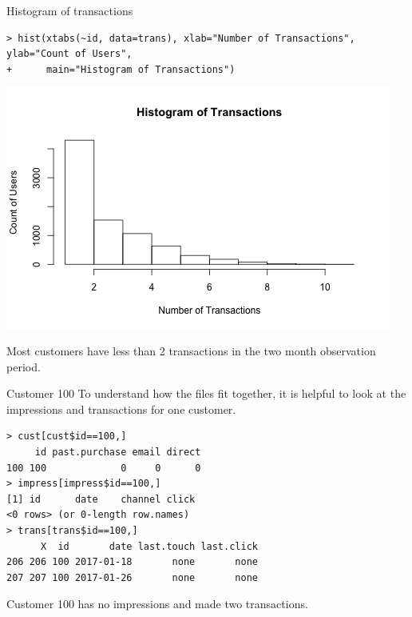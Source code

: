 \documentclass[10pt, aspectratio=169]{beamer}
\begin{document}
\begin{frame}[fragile]{Histogram of transactions}
\begin{lstlisting}
> hist(xtabs(~id, data=trans), xlab="Number of Transactions", ylab="Count of Users", 
+      main="Histogram of Transactions")
\end{lstlisting}
\begin{center}
\includegraphics[height=0.5\textheight]{images/histtrans.png}
\end{center}
\alert{Most customers have less than 2 transactions in the two month observation period.}
\end{frame}

\begin{frame}[fragile]{Customer 100}
To understand how the files fit together, it is helpful to look at the impressions and transactions for one customer. 
\begin{lstlisting}
> cust[cust$id==100,]
     id past.purchase email direct
100 100             0     0      0
> impress[impress$id==100,]
[1] id      date    channel click  
<0 rows> (or 0-length row.names)
> trans[trans$id==100,]
      X  id       date last.touch last.click
206 206 100 2017-01-18       none       none
207 207 100 2017-01-26       none       none
\end{lstlisting}
\alert{Customer 100 has no impressions and made two transactions.} 
\end{frame}
\end{document}
